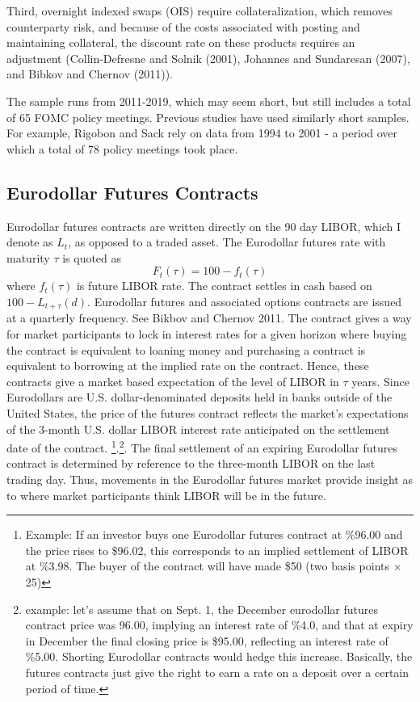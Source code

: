 \documentclass[11pt]{article}
\begin{document}
Third, overnight indexed swaps (OIS) require collateralization, which removes counterparty risk, and because of the costs associated with posting and maintaining collateral, the discount rate on these products requires an adjustment (Collin-Defresne and Solnik (2001), Johannes and Sundaresan (2007), and Bibkov and Chernov (2011)). 

The sample runs from 2011-2019, which may seem short, but still includes a total of 65 FOMC policy meetings. Previous studies have used similarly short samples. For example, Rigobon and Sack  rely on data from 1994 to 2001 - a period over which a total of 78 policy meetings took place. 

\subsection{Eurodollar Futures Contracts}
{\color{blue}Eurodollar futures contracts are written directly on the 90 day LIBOR, which I denote as $L_{t}$, as opposed to a traded asset. The Eurodollar futures rate with maturity $\tau$ is quoted as 
\begin{equation*}
	F_{t}(\tau) = 100 - f_{t}(\tau)
\end{equation*}
where $f_{t}(\tau)$ is future LIBOR rate. The contract settles in cash based on $100 - L_{t + \tau}(d)$. Eurodollar futures and associated options contracts are issued at a quarterly frequency. See Bikbov and Chernov 2011.} The contract gives a way for market participants to lock in interest rates for a given horizon where buying the contract is equivalent to loaning money and purchasing a contract is equivalent to borrowing at the implied rate on the contract. Hence, these contracts give a market based expectation of the level of LIBOR in $\tau$ years. Since Eurodollars are U.S. dollar-denominated deposits held in banks outside of the United States, the price of the futures contract reflects the market's expectations of the 3-month U.S. dollar LIBOR interest rate anticipated on the settlement date of the contract. \footnote{Example: If an investor buys one Eurodollar futures contract at \%96.00 and the price rises to \$96.02, this corresponds to an implied settlement of LIBOR at \%3.98. The buyer of the contract will have made \$50 (two basis points $\times$ 25)}.\footnote{example: let's assume that on Sept. 1, the December eurodollar futures contract price was 96.00, implying an interest rate of \%4.0, and that at expiry in December the final closing price is \$95.00, reflecting an interest rate of \%5.00. Shorting Eurodollar contracts would hedge this increase. Basically, the futures contracts just give the right to earn a rate on a deposit over a certain period of time. }. The final settlement of an expiring Eurodollar futures contract is determined by reference to the three-month LIBOR on the last trading day. Thus, movements in the Eurodollar futures market provide insight as to where market participants think LIBOR will be in the future. 
\end{document}
